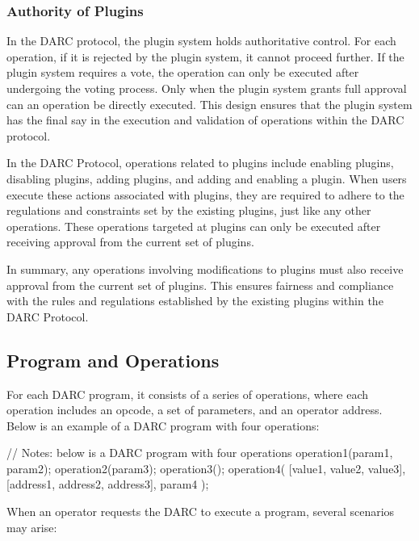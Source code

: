 \documentclass[main.tex]{subfiles}
\begin{document}
\subsubsection{Authority of Plugins}

In the DARC protocol, the plugin system holds authoritative control. For each operation, if it is rejected by the plugin system, it cannot proceed further. If the plugin system requires a vote, the operation can only be executed after undergoing the voting process. Only when the plugin system grants full approval can an operation be directly executed. This design ensures that the plugin system has the final say in the execution and validation of operations within the DARC protocol.

In the DARC Protocol, operations related to plugins include enabling plugins, disabling plugins, adding plugins, and adding and enabling a plugin. When users execute these actions associated with plugins, they are required to adhere to the regulations and constraints set by the existing plugins, just like any other operations. These operations targeted at plugins can only be executed after receiving approval from the current set of plugins.

In summary, any operations involving modifications to plugins must also receive approval from the current set of plugins. This ensures fairness and compliance with the rules and regulations established by the existing plugins within the DARC Protocol.


\subsection{Program and Operations}

For each DARC program, it consists of a series of operations, where each operation includes an opcode, a set of parameters, and an operator address. Below is an example of a DARC program with four operations:

\begin{spverbatim}

// Notes: below is a DARC program with four operations
operation1(param1, param2);
operation2(param3);
operation3();
operation4(
    [value1, value2, value3], 
    [address1, address2, address3],
    param4
);

\end{spverbatim}

When an operator requests the DARC to execute a program, several scenarios may arise:
\end{document}
